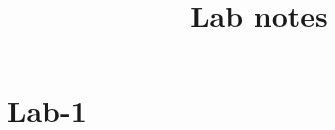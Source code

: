 \documentclass{article}
\title{Lab notes}
\begin{document}
\maketitle

\section{Lab-1}
\end{document}

